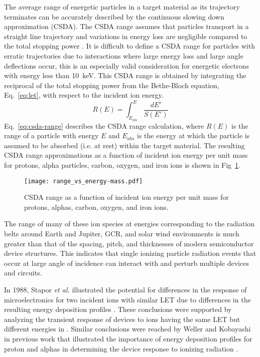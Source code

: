 The average range of energetic particles in a target material as its trajectory terminates can be accurately described by the continuous slowing down approximation (CSDA). 
The CSDA range assumes that particles transport in a straight line trajectory and variations in energy loss are negligible compared to the total stopping power \cite{bichsel1988straggling}.
It is difficult to define a CSDA range for particles with erratic trajectories due to interactions where large energy loss and large angle deflections occur, this is an especially valid consideration for energetic electrons with energy less than 10~keV.
This CSDA range is obtained by integrating the reciprocal of the total stopping power from the Bethe-Bloch equation, Eq.~\ref{eq:let}, with respect to the incident ion energy.
\begin{equation}
    \label{eq:csda-range}
    R(E) = \int_{E_{abs}}^E \frac{dE'}{S(E')}
\end{equation}
Eq.~\ref{eq:csda-range} describes the CSDA range calculation, where $R(E)$ is the range of a particle with energy $E$ and $E_{abs}$ is the energy at which the particle is assumed to be absorbed (i.e. at rest) within the target material.
The resulting CSDA range approximations as a function of incident ion energy per unit mass for protons, alpha particles, carbon, oxygen, and iron ions is shown in Fig~\ref{fig:range-vs-energy-per-mass}.
\begin{figure}[tb]
    \begin{center}
        \texttt{[image: range\_vs\_energy-mass.pdf]}
    \end{center}
    \caption{CSDA range as a function of incident ion energy per unit mass for protons, alphas, carbon, oxygen, and iron ions.}
    \label{fig:range-vs-energy-per-mass}
\end{figure}

The range of many of these ion species at energies corresponding to the radiation belts around Earth and Jupiter, GCR, and solar wind environments is much greater than that of the spacing, pitch, and thicknesses of modern semiconductor device structures.
This indicates that single ionizing particle radiation events that occur at large angle of incidence can interact with and perturb multiple devices and circuits.

In 1988, Stapor \emph{et al.} illustrated the potential for differences in the response of microelectronics for two incident ions with similar LET due to differences in the resulting energy deposition profiles \cite{Stapor:1988ws}. 
These conclusions were supported by analyzing the transient response of devices to ions having the same LET but different energies in \cite{HowardJr:2002vg}.
Similar conclusions were reached by Weller and Kobayashi in previous work that illustrated the importance of energy deposition profiles for proton and alphas in determining the device response to ionizing radiation \cite{Weller:2003je, Kobayashi:2004dg}.

